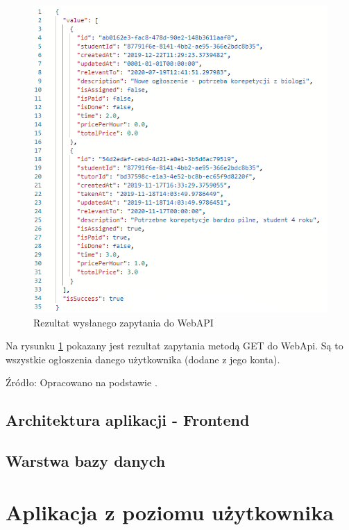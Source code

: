 \documentclass[12pt]{article}
\numberwithin{figure}{section}
\begin{document}
        \begin{figure}[H] 
         	\centering
        	\includegraphics[width=.8\textwidth]{images/chapter_3/json-get.png}
        	\caption{Rezultat wysłanego zapytania do WebAPI}
        	\label{fig:json-get}
        \end{figure}
        
        Na rysunku \ref{fig:json-get} pokazany jest rezultat zapytania metodą GET do WebApi. Są to wszystkie ogłoszenia danego użytkownika (dodane z jego konta).
        
        Źródło: Opracowano na podstawie \cite{json}.
        
    \subsection{Architektura aplikacji - Frontend}

    \subsection{Warstwa bazy danych}
\section{Aplikacja z poziomu użytkownika}
\end{document}
